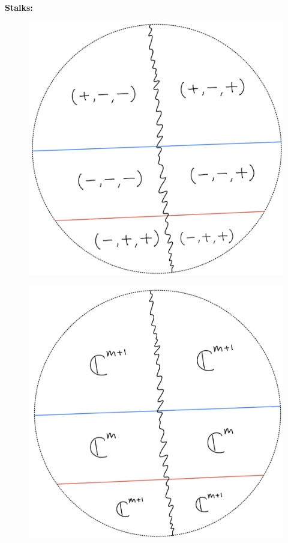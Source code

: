 \textbf{Stalks:}
\begin{figure}[H]
    \centering
    \includegraphics[scale = 0.95]{diagrams/lemma1/19.png} 
    \caption{}
    \label{fig:your-label}
\end{figure}
\begin{figure}[H]
    \centering
    \includegraphics[scale = 0.95]{diagrams/lemma1/20.png} 
    \caption{}
    \label{fig:your-label}
\end{figure}
